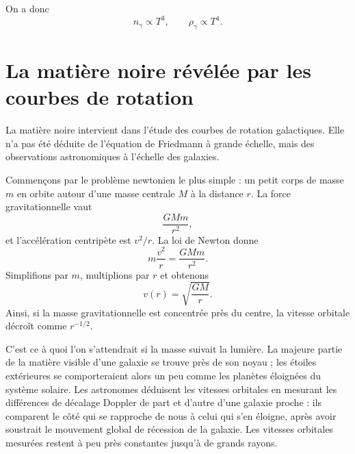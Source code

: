 \begin{classroomqa}
\end{classroomqa}

On a donc
\begin{equation}
n_\gamma\propto T^3,
\qquad
\rho_\gamma\propto T^4.
\end{equation}

\section{La matière noire révélée par les courbes de rotation}

La matière noire intervient dans l’étude des courbes de rotation galactiques. Elle n’a pas été déduite de l’équation de Friedmann à grande échelle, mais des observations astronomiques à l’échelle des galaxies.

Commençons par le problème newtonien le plus simple : un petit corps de masse \(m\) en orbite autour d’une masse centrale \(M\) à la distance \(r\). La force gravitationnelle vaut
\begin{equation}
\frac{GMm}{r^2},
\end{equation}
et l’accélération centripète est \(v^2/r\). La loi de Newton donne
\begin{equation}
m\frac{v^2}{r}=\frac{GMm}{r^2}.
\end{equation}
Simplifions par \(m\), multiplions par \(r\) et obtenons
\begin{equation}
v(r)=\sqrt{\frac{GM}{r}}.
\end{equation}
Ainsi, si la masse gravitationnelle est concentrée près du centre, la vitesse orbitale décroît comme \(r^{-1/2}\).

C’est ce à quoi l’on s’attendrait si la masse suivait la lumière. La majeure partie de la matière visible d’une galaxie se trouve près de son noyau ; les étoiles extérieures se comporteraient alors un peu comme les planètes éloignées du système solaire. Les astronomes déduisent les vitesses orbitales en mesurant les différences de décalage Doppler de part et d’autre d’une galaxie proche : ils comparent le côté qui se rapproche de nous à celui qui s’en éloigne, après avoir soustrait le mouvement global de récession de la galaxie. Les vitesses orbitales mesurées restent à peu près constantes jusqu’à de grands rayons.

